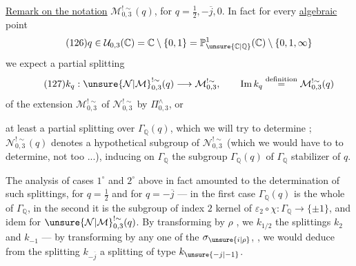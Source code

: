 \uline{Remark on the notation} $\mathcal M_{0,3}^{!\sim}(q)$,
for $q=\frac12,-\overline j,0$.
In fact for every \uline{algebraic} point
\[
\tag{126}
q\in\mathcal U_{0,3}(\mathbb C)
=\mathbb C\setminus\{0,1\}
=\mathbb P^1_{\unsure{\mathbb C|\mathbb Q}}(\mathbb C)
\setminus\{0,1,\infty\}
\]
we expect  a partial splitting
\[
\tag{127}
k_q:\unsure{\mathcal N|\mathcal M}_{0,3}^{!\sim}(q)\longrightarrow\mathcal M_{0,3}^{!\sim},
\qquad\operatorname{Im}k_q\overset{\text{definition}}=\mathcal M_{0,3}^{!\sim}(q)
\]
of the extension $\mathcal M_{0,3}^{!\sim}$ of
$\mathcal N_{0,3}^{!\sim}$ by $\Pi_{0,3}^{\wedge}$, or



at least  a partial splitting over
$\Gamma_{\mathbb Q}(q)$, which we will try to determine ;
$\mathcal N_{0,3}^{!\sim}(q)$ denotes a hypothetical
subgroup of $\mathcal N_{0,3}^{!\sim}$
(which we would have to  to determine, 
 not too ...), inducing on $\Gamma_{\mathbb Q}$
the  subgroup $\Gamma_{\mathbb Q}(q)$ of
$\Gamma_{\mathbb Q}$ stabilizer of $q$.


The analysis of cases $1^\circ$ and $2^\circ$ above in fact amounted to
the determination of such splittings, for $q=\frac12$ and for
$q=-\overline j$ --- in the first case $\Gamma_{\mathbb Q}(q)$ is
the whole of $\Gamma_{\mathbb Q}$, in the second it is the subgroup
of index $2$ kernel of $\varepsilon_2\circ\chi:\Gamma_{\mathbb Q}
\longrightarrow\{\pm1\}$, and idem for
$\unsure{\mathcal N|\mathcal M}_{0,3}^{!\sim}(q)$.
By transforming by $\rho$ , we
  $k_{1/2}$
the splittings $k_2$ and $k_{-1}$ --- by transforming by any one
of the $\sigma_{\unsure{i|\rho}}$,
, we would deduce
from the splitting $k_{-\overline j}$ a splitting of type $k_{\unsure{-j|-1}}$.

